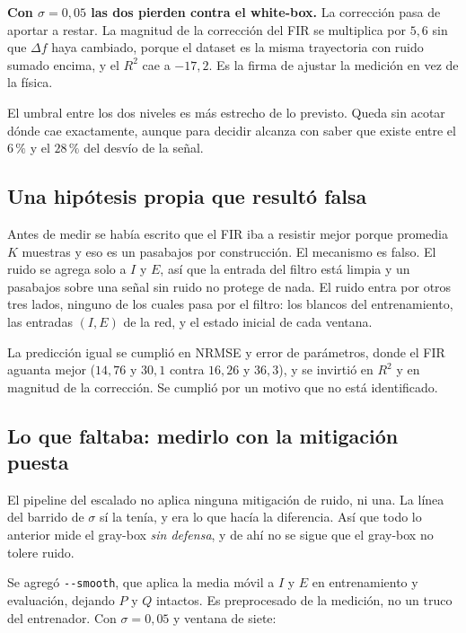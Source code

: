\documentclass[11pt,a4paper]{article}
\begin{document}
\smallskip\par\textbf{Con $\sigma = 0{,}05$ las dos pierden contra el
white-box.} La corrección pasa de aportar a restar. La magnitud de la corrección
del FIR se multiplica por $5{,}6$ sin que $\Delta f$ haya cambiado, porque el
dataset es la misma trayectoria con ruido sumado encima, y el $R^2$ cae a
$-17{,}2$. Es la firma de ajustar la medición en vez de la física.

El umbral entre los dos niveles es más estrecho de lo previsto. Queda sin acotar
dónde cae exactamente, aunque para decidir alcanza con saber que existe entre el
$6\,\%$ y el $28\,\%$ del desvío de la señal.

\subsection{Una hipótesis propia que resultó falsa}

Antes de medir se había escrito que el FIR iba a resistir mejor porque promedia
$K$ muestras y eso es un pasabajos por construcción. El mecanismo es falso. El
ruido se agrega solo a $I$ y $E$, así que la entrada del filtro está limpia y un
pasabajos sobre una señal sin ruido no protege de nada. El ruido entra por otros
tres lados, ninguno de los cuales pasa por el filtro: los blancos del
entrenamiento, las entradas $(I,E)$ de la red, y el estado inicial de cada
ventana.

La predicción igual se cumplió en NRMSE y error de parámetros, donde el FIR
aguanta mejor ($14{,}76$ y $30{,}1$ contra $16{,}26$ y $36{,}3$), y se invirtió
en $R^2$ y en magnitud de la corrección. Se cumplió por un motivo que no está
identificado.

\subsection{Lo que faltaba: medirlo con la mitigación puesta}

El pipeline del escalado no aplica ninguna mitigación de ruido, ni una. La línea
del barrido de $\sigma$ sí la tenía, y era lo que hacía la diferencia. Así que
todo lo anterior mide el gray-box \emph{sin defensa}, y de ahí no se sigue que el
gray-box no tolere ruido.

Se agregó \texttt{-{}-smooth}, que aplica la media móvil a $I$ y $E$ en
entrenamiento y evaluación, dejando $P$ y $Q$ intactos. Es preprocesado de la
medición, no un truco del entrenador. Con $\sigma = 0{,}05$ y ventana de siete:
\end{document}
